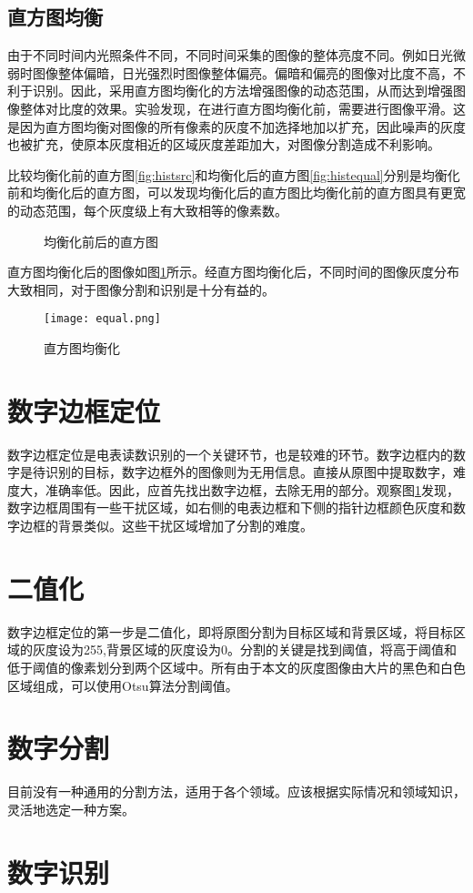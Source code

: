 \subsection{直方图均衡}


由于不同时间内光照条件不同，不同时间采集的图像的整体亮度不同。例如日光微弱时图像整体偏暗，日光强烈时图像整体偏亮。偏暗和偏亮的图像对比度不高，不利于识别。因此，采用直方图均衡化的方法增强图像的动态范围，从而达到增强图像整体对比度的效果。实验发现，在进行直方图均衡化前，需要进行图像平滑。这是因为直方图均衡对图像的所有像素的灰度不加选择地加以扩充，因此噪声的灰度也被扩充，使原本灰度相近的区域灰度差距加大，对图像分割造成不利影响。

比较均衡化前的直方图\ref{fig:histsrc}和均衡化后的直方图\ref{fig:histequal}分别是均衡化前和均衡化后的直方图，可以发现均衡化后的直方图比均衡化前的直方图具有更宽的动态范围，每个灰度级上有大致相等的像素数。
\begin{figure}[h]
  \centering
  \caption{均衡化前后的直方图}
\end{figure}
直方图均衡化后的图像如图\ref{fig:equal}所示。经直方图均衡化后，不同时间的图像灰度分布大致相同，对于图像分割和识别是十分有益的。
\begin{figure}[h]
  \centering
  \texttt{[image: equal.png]}
  \caption{直方图均衡化}
  \label{fig:equal}
\end{figure}



\section{数字边框定位}

数字边框定位是电表读数识别的一个关键环节，也是较难的环节。数字边框内的数字是待识别的目标，数字边框外的图像则为无用信息。直接从原图中提取数字，难度大，准确率低。因此，应首先找出数字边框，去除无用的部分。观察图\ref{fig:equal}发现，数字边框周围有一些干扰区域，如右侧的电表边框和下侧的指针边框颜色灰度和数字边框的背景类似。这些干扰区域增加了分割的难度。

\section{二值化}

数字边框定位的第一步是二值化，即将原图分割为目标区域和背景区域，将目标区域的灰度设为255,背景区域的灰度设为0。分割的关键是找到阈值，将高于阈值和低于阈值的像素划分到两个区域中。所有由于本文的灰度图像由大片的黑色和白色区域组成，可以使用Otsu算法分割阈值。




\section{数字分割}

目前没有一种通用的分割方法，适用于各个领域。应该根据实际情况和领域知识，灵活地选定一种方案。

\section{数字识别}



